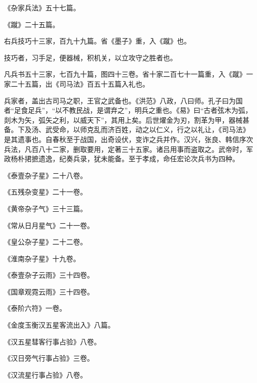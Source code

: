 \documentclass[12pt,UTF8]{ctexbook}
\begin{document}
《杂家兵法》五十七篇。



《蹴》二十五篇。



右兵技巧十三家，百九十九篇。省《墨子》重，入《蹴》也。



技巧者，习手足，便器械，积机关，以立攻守之胜者也。



凡兵书五十三家，七百九十篇，图四十三卷。省十家二百七十一篇重，入《蹴》一家二十五篇，出《司马法》百五十五篇入礼也。



兵家者，盖出古司马之职，王官之武备也。《洪范》八政，八曰师。孔子曰为国者“足食足兵”，“以不教民战，是谓弃之”，明兵之重也。《易》曰“古者弦木为弧，剡木为矢，弧矢之利，以威天下”，其用上矣。后世燿金为刃，割革为甲，器械甚备。下及汤、武受命，以师克乱而济百姓，动之以仁义，行之以礼让，《司马法》是其遗事也。自春秋至于战国，出奇设伏，变诈之兵并作。汉兴，张良、韩信序次兵法，凡百八十二家，删取要用，定著三十五家。诸吕用事而盗取之。武帝时，军政杨朴捃摭遗逸，纪奏兵录，犹未能备。至于孝成，命任宏论次兵书为四种。



《泰壹杂子星》二十八卷。



《五残杂变星》二十一卷。



《黄帝杂子气》三十三篇。



《常从日月星气》二十一卷。



《皇公杂子星》二十二卷。



《淮南杂子星》十九卷。



《泰壹杂子云雨》三十四卷。



《国章观霓云雨》三十四卷。



《泰阶六符》一卷。



《金度玉衡汉五星客流出入》八篇。



《汉五星彗客行事占验》八卷。



《汉日旁气行事占验》三卷。



《汉流星行事占验》八卷。
\end{document}
